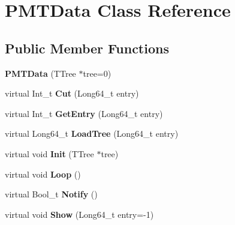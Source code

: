 \hypertarget{classPMTData}{
\section{PMTData Class Reference}
\label{classPMTData}
}
\subsection*{Public Member Functions}
\begin{DoxyCompactItemize}
\item 
\hypertarget{classPMTData_a9fb3e9a250f7d6f53ffd3cd486a6c9ca}{
{\bfseries PMTData} (TTree $\ast$tree=0)}
\label{classPMTData_a9fb3e9a250f7d6f53ffd3cd486a6c9ca}

\item 
\hypertarget{classPMTData_a151bf99e0c8eebea744a35c1388decff}{
virtual Int\_\-t {\bfseries Cut} (Long64\_\-t entry)}
\label{classPMTData_a151bf99e0c8eebea744a35c1388decff}

\item 
\hypertarget{classPMTData_a0773b13bc2ba5ca2cb9f0605aeb747c8}{
virtual Int\_\-t {\bfseries GetEntry} (Long64\_\-t entry)}
\label{classPMTData_a0773b13bc2ba5ca2cb9f0605aeb747c8}

\item 
\hypertarget{classPMTData_a5a3112418d78d73252fd02ebbe17c208}{
virtual Long64\_\-t {\bfseries LoadTree} (Long64\_\-t entry)}
\label{classPMTData_a5a3112418d78d73252fd02ebbe17c208}

\item 
\hypertarget{classPMTData_ac40dd75e44910a6e175c4397ed26caca}{
virtual void {\bfseries Init} (TTree $\ast$tree)}
\label{classPMTData_ac40dd75e44910a6e175c4397ed26caca}

\item 
\hypertarget{classPMTData_a109253ff2e9aee1cb5bbb25627212c34}{
virtual void {\bfseries Loop} ()}
\label{classPMTData_a109253ff2e9aee1cb5bbb25627212c34}

\item 
\hypertarget{classPMTData_a24e98a85f082df3ad82dc69e9004d97d}{
virtual Bool\_\-t {\bfseries Notify} ()}
\label{classPMTData_a24e98a85f082df3ad82dc69e9004d97d}

\item 
\hypertarget{classPMTData_a486dd48b9431a34fa8126566e7c5af07}{
virtual void {\bfseries Show} (Long64\_\-t entry=-\/1)}
\label{classPMTData_a486dd48b9431a34fa8126566e7c5af07}

\end{DoxyCompactItemize}
